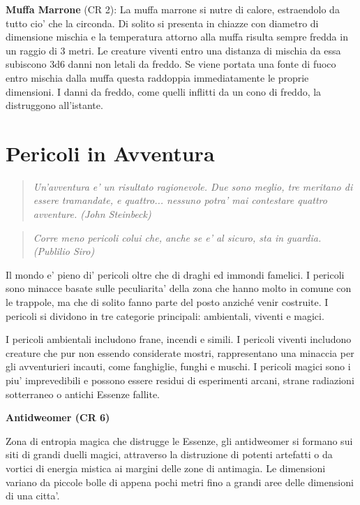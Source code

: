 \documentclass[a4paper,11pt,twoside,openany]{book}
\begin{document}
\textbf{Muffa Marrone} (CR 2): La muffa marrone si nutre di calore, estraendolo da tutto cio' che la circonda. Di solito si presenta in chiazze con diametro di dimensione mischia e la temperatura attorno alla muffa risulta sempre fredda in un raggio di 3 metri. Le creature viventi entro una distanza di mischia da essa subiscono 3d6 danni non letali da freddo. Se viene portata una fonte di fuoco entro mischia dalla muffa questa raddoppia immediatamente le proprie dimensioni. I danni da freddo, come quelli inflitti da un cono di freddo, la distruggono all'istante.

\pagebreak

\section{Pericoli in Avventura}


\begin{quote}\textit{
		{Un'avventura e' un risultato ragionevole. Due sono meglio, tre meritano di essere tramandate, e quattro... nessuno potra' mai contestare quattro avventure. (John Steinbeck)}
}\end{quote}


\label{pericoli-in-avventura}
\begin{quote}\textit{Corre meno pericoli colui che, anche se e' al sicuro, sta in guardia. (Publilio Siro)
}\end{quote}
Il mondo e' pieno di' pericoli oltre che di draghi ed immondi famelici. I pericoli sono minacce basate sulle peculiarita' della zona che hanno molto in comune con le trappole, ma che di solito fanno parte del posto anziché venir costruite. I pericoli si dividono in tre categorie principali: ambientali, viventi e magici.

I pericoli ambientali includono frane, incendi e simili. I pericoli viventi includono creature che pur non essendo considerate mostri, rappresentano una minaccia per gli av­venturieri incauti, come fanghiglie, funghi e muschi. I pericoli magici sono i piu' imprevedibili e possono essere residui di esperimenti arcani, strane radiazioni sotterraneo o antichi Essenze fallite.

\textbf{Antidweomer (CR 6)}

Zona di entropia magica che distrugge le Essenze, gli antidweomer si formano sui siti di grandi duelli magici, attraverso la distruzione di potenti artefatti o da vortici di energia mistica ai margini delle zone di antimagia. Le dimensioni variano da piccole bolle di appena pochi metri fino a grandi aree delle dimensioni di una citta'. 
\end{document}
